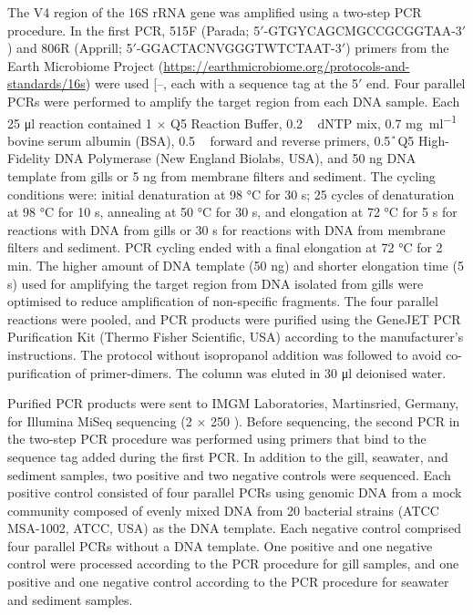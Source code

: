 \documentclass[
  12 pt,
]{article}
\begin{document}
The V4 region of the 16S rRNA gene was amplified using a two-step PCR procedure. In the first PCR, 515F (Parada; 5\('\)-GTGYCAGCMGCCGCGGTAA-3\('\)) and 806R (Apprill; 5\('\)-GGACTACNVGGGTWTCTAAT-3\('\)) primers from the Earth Microbiome Project (\url{https://earthmicrobiome.org/protocols-and-standards/16s}) were used {[}--\citeproc{ref-Parada2016}{56}{]}, each with a sequence tag at the 5\('\) end. Four parallel PCRs were performed to amplify the target region from each DNA sample. Each 25 \unit{\ul} reaction contained 1 × Q5 Reaction Buffer, 0.2 \unit{\milli\Molar} dNTP mix, 0.7 \unit{\mg\per\ml} bovine serum albumin (BSA), 0.5 \unit{\micro\Molar} forward and
reverse primers, 0.5 \unit{\U} Q5 High-Fidelity DNA Polymerase (New England Biolabs, USA), and 50 \unit{\ng} DNA template from gills or 5 \unit{\ng} from membrane filters and sediment. The cycling conditions were: initial denaturation at 98 \unit{\degreeCelsius} for 30 \unit{\s}; 25 cycles of denaturation at 98 \unit{\degreeCelsius} for 10 \unit{\s}, annealing at 50 \unit{\degreeCelsius} for 30 \unit{\s}, and elongation at 72 \unit{\degreeCelsius} for 5 \unit{\s} for reactions with DNA from gills or 30 \unit{\s} for reactions with DNA from membrane filters and sediment. PCR cycling ended with a final elongation at 72 \unit{\degreeCelsius} for 2 \unit{\minute}. The higher amount of DNA template (50 \unit{\ng}) and shorter elongation time (5 \unit{\s}) used for amplifying the target region from DNA isolated from gills were optimised to reduce amplification of non-specific fragments. The four parallel reactions were pooled, and PCR products were purified using the GeneJET PCR Purification Kit (Thermo Fisher Scientific, USA) according to the manufacturer's instructions. The protocol without isopropanol addition was followed to avoid co-purification of primer-dimers. The column was eluted in 30 \unit{\ul} deionised water.

Purified PCR products were sent to IMGM Laboratories, Martinsried, Germany, for Illumina MiSeq sequencing (2 × 250 \unit{\bp}). Before sequencing, the second PCR in the two-step PCR procedure was performed using primers that bind to the sequence tag added during the first PCR. In addition to the gill, seawater, and sediment samples, two positive and two negative controls were sequenced. Each positive control consisted of four parallel PCRs using genomic DNA from a mock community composed of evenly mixed DNA from 20 bacterial strains (ATCC MSA-1002, ATCC, USA) as the DNA template. Each negative control comprised four parallel PCRs without a DNA template. One positive and one negative control were processed according to the PCR procedure for gill samples, and one positive and one negative control according to the PCR procedure for seawater and sediment samples.
\end{document}

